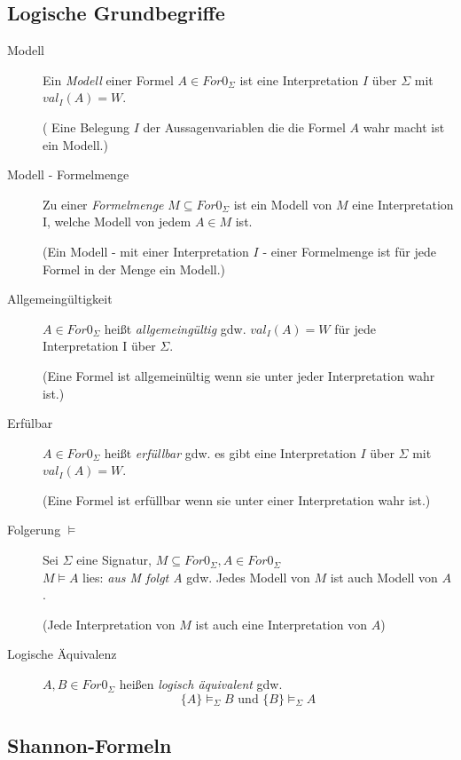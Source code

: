 \documentclass{article}
\begin{document}
\subsection{Logische Grundbegriffe}
\begin{description}
    \item[Modell] Ein \textit{Modell} einer Formel $A \in For0_\Sigma$ ist eine Interpretation $I$ \"uber $\Sigma$ mit $val_I(A) = W$.

    ( Eine Belegung $I$ der Aussagenvariablen die die Formel $A$ wahr macht ist ein Modell.)

\item[Modell - Formelmenge] Zu einer \textit{Formelmenge} $M \subseteq For0_\Sigma$ ist ein Modell von $M$ eine Interpretation I, welche Modell von jedem $A \in M$ ist. 
    
    (Ein Modell - mit einer Interpretation $I$ - einer Formelmenge ist f\"ur jede Formel in der Menge ein Modell.)

\item[Allgemeing\"ultigkeit]
    $A \in For0_\Sigma$ hei{\ss}t \textit{allgemeing\"ultig} gdw. 
    $val_I(A) = W$ f\"ur jede Interpretation I \"uber $\Sigma$.

    (Eine Formel ist allgemein\"ultig wenn sie unter jeder Interpretation wahr ist.)

\item[Erf\"ulbar]
    $A \in For0_\Sigma$ hei{\ss}t \textit{erf\"ullbar} gdw.
    es gibt eine Interpretation $I$ \"uber $\Sigma$ mit $val_I(A) = W$.

    (Eine Formel ist erf\"ullbar wenn sie unter einer Interpretation wahr ist.)

\item[Folgerung $\models$]
    Sei $\Sigma$ eine Signatur, $M \subseteq For0_\Sigma, A \in For0_\Sigma$ \\
    $M \models A$ lies: \textit{aus M folgt A} gdw.
    Jedes Modell von $M$ ist auch Modell von $A$.

    (Jede Interpretation von $M$ ist auch eine Interpretation von $A$)

\item[Logische \"Aquivalenz]
    $A, B \in For0_\Sigma$ hei{\ss}en \textit{logisch \"aquivalent} gdw.
    \[ \{ A\} \models_\Sigma B \text{ und } \{B\} \models_\Sigma A \]
\end{description}
\subsection{Shannon-Formeln}
\end{document}
